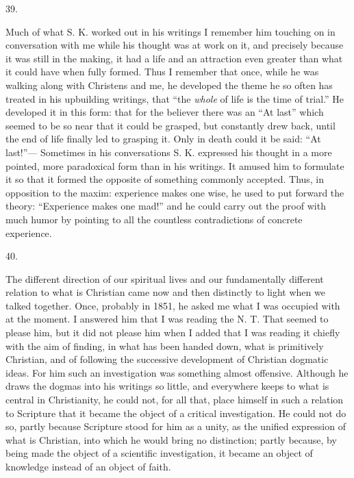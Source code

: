 \documentclass[12pt,a4paper,openany]{book}
\newcommand{\secnum}[1]{\par\begin{center}#1\end{center}\par\nobreak}
\newcommand{\opage}[1]{\marginnote{\footnotesize\textit{[#1]}}}
\begin{document}
\secnum{39.}

Much of what S. K. worked out in his writings
I remember him touching on in conversation with me while
his thought was at work on it, and precisely because
it was still in the making, it had a life and an attraction
even greater than what it could have when fully formed.
Thus I remember that once, while he was walking along
\opage{365}with Christens and me, he developed the theme he so often
has treated in his upbuilding writings, that ``the \emph{whole} of life
is the time of trial.'' He developed it in this form: that
for the believer there was an ``At last'' which seemed to
be so near that it could be grasped, but constantly drew
back, until the end of life finally led to grasping
it. Only in death could it be said: ``At last!''---
Sometimes in his conversations S. K. expressed his thought in
a more pointed, more paradoxical form than in his writings.
It amused him to formulate it so that it formed
the opposite of something commonly accepted. Thus, in opposition
to the maxim: experience makes one wise, he used
to put forward the theory: ``Experience makes one mad!'' and he
could carry out the proof with much humor by pointing
to all the countless contradictions of concrete experience.

\secnum{40.}

The different direction of our spiritual lives and our
fundamentally different relation to what is Christian came now and then
distinctly to light when we talked together. Once, probably
in 1851, he asked me what I was occupied
with at the moment. I answered him that I was reading the
N. T. That seemed to please him, but it did not please
him when I added that I was reading it chiefly with
the aim of finding, in what has been handed down, what is primitively
Christian, and of following the successive development of
Christian dogmatic ideas. For him such
an investigation was something almost offensive. Although
he draws the dogmas into his writings so little, and everywhere
keeps to what is central in Christianity, he
could not, for all that, place himself in such a relation to Scripture
that it became the object of a critical investigation. He
could not do so, partly because Scripture stood for him as a
unity, as the unified expression of what is Christian, into which
he would bring no distinction; partly because, by
\opage{366}being made the object of a scientific investigation,
it became an object of knowledge instead of an object of faith.
\end{document}
